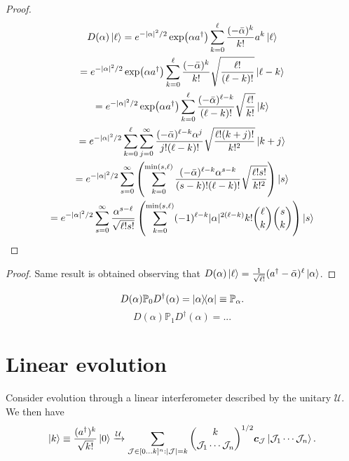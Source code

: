 \documentclass[12pt]{report}
\newcommand{\PP}{\mathbb{P}}
\newcommand{\bs}[1]{\boldsymbol{#1}}
\newcommand{\calJ}{{\mathcal{J}}}
\newcommand{\calU}{{\mathcal{U}}}
\begin{document}
\begin{proof}
	\begin{equation}
	\begin{gathered}
		D(\alpha) \ket \ell
		= e^{-|\alpha|^2/2}
		\exp(\alpha a^\dagger) 
		\sum_{k=0}^\ell \frac{(-\bar\alpha)^k}{k!} a^k \ket\ell \\
		= e^{-|\alpha|^2/2}
		\exp(\alpha a^\dagger) 
		\sum_{k=0}^\ell \frac{(-\bar\alpha)^k}{k!} \sqrt{\frac{\ell!}{(\ell-k)!}} \ket{\ell-k} \\
		= e^{-|\alpha|^2/2}
		\exp(\alpha a^\dagger) 
		\sum_{k=0}^\ell
		\frac{(-\bar\alpha)^{\ell-k}}{(\ell-k)!} \sqrt{\frac{\ell!}{k!}} \ket{k} \\
		= e^{-|\alpha|^2/2}
		\sum_{k=0}^\ell\sum_{j=0}^\infty
		\frac{(-\bar\alpha)^{\ell-k} \alpha^j}{j!(\ell-k)!} \sqrt{\frac{\ell!(k+j)!}{k!^2}} \ket{k+j} \\
		= e^{-|\alpha|^2/2}
		\sum_{s=0}^\infty \left(
			\sum_{k=0}^{\min(s,\ell)}
			\frac{(-\bar\alpha)^{\ell-k} \alpha^{s-k}}{(s-k)!(\ell-k)!} \sqrt{\frac{\ell!s!}{k!^2}} 
		\right) \ket{s} \\
		= e^{-|\alpha|^2/2}
		\sum_{s=0}^\infty \frac{\alpha^{s-\ell}}{\sqrt{\ell!s!}}
		\left(
		\sum_{k=0}^{\min(s,\ell)}
		(-1)^{\ell-k}|\alpha|^{2(\ell-k)} k!\binom{\ell}{k}\binom{s}{k}
		\right)
		\ket{s} 
	\end{gathered}
	\end{equation}
\end{proof}
\begin{proof}
	Same result is obtained observing that
	$D(\alpha)\ket\ell=\frac{1}{\sqrt{\ell!}}(a^\dagger-\bar\alpha)^\ell \ket\alpha$.
\end{proof}

\begin{prop}
	\begin{equation}
		D(\alpha)\PP_0 D^\dagger(\alpha) = \ketbra\alpha \equiv \PP_\alpha.
	\end{equation}
	\begin{equation}
		D(\alpha)\PP_1 D^\dagger(\alpha)
		= ...
	\end{equation}
\end{prop}

\section{Linear evolution}

\begin{prop}
	Consider evolution through a linear interferometer described by the unitary $\calU$. We then have
	\begin{equation}
		\ket k \equiv \frac{(a^\dagger)^k}{\sqrt{k!}} \ket 0
		\xrightarrow{\calU} \sum_{\calJ\in[0...k]^n : |\calJ|=k}
		\binom{k}{\calJ_1\cdots \calJ_n}^{1/2}
		\bs c_{\calJ}
		\ket{\calJ_1\cdots \calJ_n}.
	\end{equation}
\end{prop}
\end{document}
